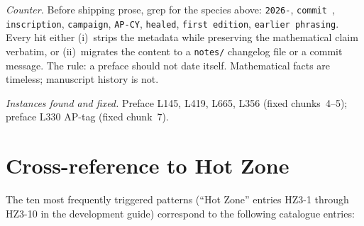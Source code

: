 \emph{Counter.}  Before shipping prose, grep for the species above:
\verb|2026-|, \verb|commit |, \verb|inscription|, \verb|campaign|,
\verb|AP-CY|, \verb|healed|, \verb|first edition|,
\verb|earlier phrasing|.  Every hit either (i)~strips the metadata
while preserving the mathematical claim verbatim, or (ii)~migrates
the content to a \verb|notes/| changelog file or a commit message.
The rule: a preface should not date itself.  Mathematical facts are
timeless; manuscript history is not.

\emph{Instances found and fixed.}  Preface L145, L419, L665, L356
(fixed chunks~4--5); preface L330 AP-tag (fixed chunk~7).

\section{Cross-reference to Hot Zone}
\label{sec:ap-hot-zone-xref}

The ten most frequently triggered patterns (``Hot Zone'' entries
HZ3-1 through HZ3-10 in the development guide) correspond to the
following catalogue entries:

